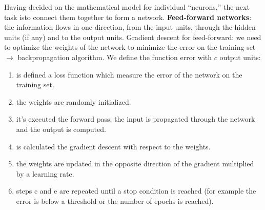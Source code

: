 \documentclass[12pt]{article}
\begin{document}
\begin{enumerate}[label=\textbf{ML.\arabic*}]
    Having decided on the mathematical model for individual “neurons,”  the next task isto connect them together to form a network.
    \textbf{Feed-forward networks}: the information flows in one direction, from the input units, through the hidden units (if any) and to the output units.
    Gradient descent for feed-forward: we need to optimize the weights of the network to minimize the error on the training set $\rightarrow$ backpropagation algorithm.
    We define the function error with $c$ output units:
    \begin{enumerate}
        \item is defined a loss function which measure the error of the network on the training set.
        \item the weights are randomly initialized.
        \item it's executed the forward pass: the input is propagated through the network and the output is computed.
        \item is calculated the gradient descent with respect to the weights.
        \item the weights are updated in the opposite direction of the gradient multiplied by a learning rate.
        \item steps c and e are repeated until a stop condition is reached (for example the error is below a threshold or the number of epochs is reached).
    \end{enumerate}


\end{enumerate}
\end{document}
